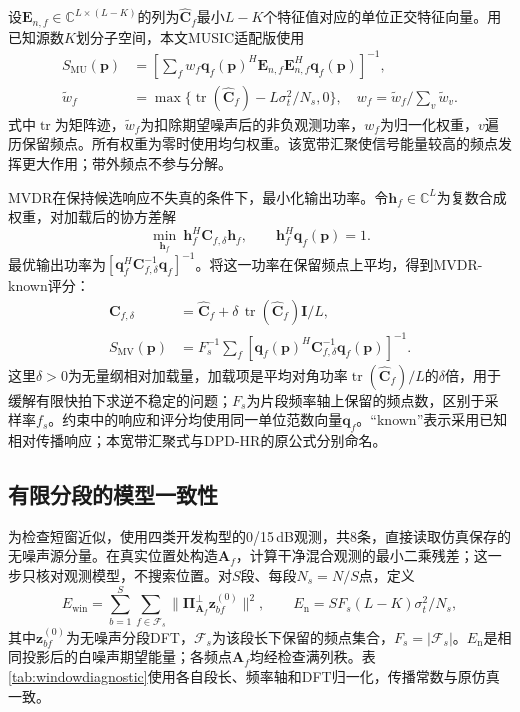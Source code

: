 \documentclass[a4paper,fleqn]{cas-sc}
\numberwithin{equation}{section}
\numberwithin{figure}{section}
\numberwithin{table}{section}
\newcommand{\C}{\mathbb C}
\newcommand{\tr}{\operatorname{tr}}
\begin{document}
设$\bm E_{n,f}\in\C^{L\times(L-K)}$的列为$\widehat{\bm C}_f$最小$L-K$个特征值对应的单位正交特征向量。用已知源数$K$划分子空间，本文MUSIC适配版使用
\begin{align}
 S_{\mathrm{MU}}(\bm p)&=\left[\sum_f w_f
 \bm q_f(\bm p)^H\bm E_{n,f}\bm E_{n,f}^H\bm q_f(\bm p)\right]^{-1},\label{eq:music}\\
 \widetilde w_f&=\max\{\tr(\widehat{\bm C}_f)-L\sigma_t^2/N_s,0\},\quad
 w_f=\widetilde w_f/\sum_v\widetilde w_v .\nonumber
\end{align}
式中$\tr$为矩阵迹，$\widetilde w_f$为扣除期望噪声后的非负观测功率，$w_f$为归一化权重，$v$遍历保留频点。所有权重为零时使用均匀权重。该宽带汇聚使信号能量较高的频点发挥更大作用；带外频点不参与分解。

MVDR在保持候选响应不失真的条件下，最小化输出功率\cite{Capon1969}。令$\bm h_f\in\C^L$为复数合成权重，对加载后的协方差解
\begin{equation}
 \min_{\bm h_f}\ \bm h_f^H\bm C_{f,\delta}\bm h_f,
 \qquad \bm h_f^H\bm q_f(\bm p)=1.\label{eq:mvdrConstraint}
\end{equation}
最优输出功率为$[\bm q_f^H\bm C_{f,\delta}^{-1}\bm q_f]^{-1}$。将这一功率在保留频点上平均，得到MVDR-known评分：
\begin{align}
 \bm C_{f,\delta}&=\widehat{\bm C}_f+
 \delta\,\tr(\widehat{\bm C}_f)\bm I/L,\nonumber\\
 S_{\mathrm{MV}}(\bm p)&=F_s^{-1}\sum_f
 [\bm q_f(\bm p)^H\bm C_{f,\delta}^{-1}\bm q_f(\bm p)]^{-1} .\label{eq:mvdr}
\end{align}
这里$\delta>0$为无量纲相对加载量，加载项是平均对角功率$\tr(\widehat{\bm C}_f)/L$的$\delta$倍，用于缓解有限快拍下求逆不稳定的问题；$F_s$为片段频率轴上保留的频点数，区别于采样率$f_s$。约束中的响应和评分均使用同一单位范数向量$\bm q_f$。“known”表示采用已知相对传播响应；本宽带汇聚式与DPD-HR的原公式分别命名\cite{TirerWeiss2016}。

\subsection{有限分段的模型一致性}\label{app:segmentcheck}
为检查短窗近似，使用四类开发构型的0/15\,dB观测，共8条，直接读取仿真保存的无噪声源分量。在真实位置处构造$\bm A_f$，计算干净混合观测的最小二乘残差；这一步只核对观测模型，不搜索位置。对$S$段、每段$N_s=N/S$点，定义
\begin{equation}
 E_{\mathrm{win}}=\sum_{b=1}^{S}\sum_{f\in\mathcal F_s}
 \|\bm\Pi_{\bm A_f}^{\perp}\bm z_{bf}^{(0)}\|^2,\qquad
 E_{\mathrm n}=SF_s(L-K)\sigma_t^2/N_s ,
 \label{eq:windowdiagnostic}
\end{equation}
其中$\bm z_{bf}^{(0)}$为无噪声分段DFT，$\mathcal F_s$为该段长下保留的频点集合，$F_s=|\mathcal F_s|$。$E_{\mathrm n}$是相同投影后的白噪声期望能量；各频点$\bm A_f$均经检查满列秩。表\ref{tab:windowdiagnostic}使用各自段长、频率轴和DFT归一化，传播常数与原仿真一致。
\end{document}
